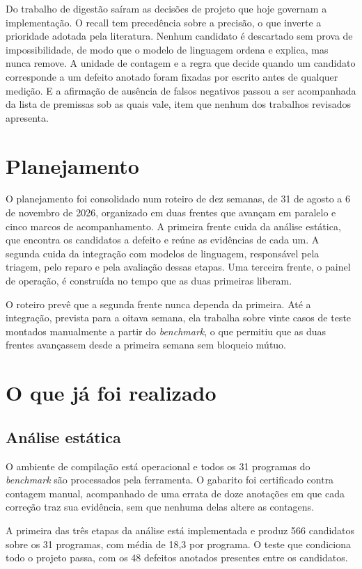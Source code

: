 \documentclass[article,12pt,oneside,a4paper,english,brazil]{abntex2}
\begin{document}
Do trabalho de digestão saíram as decisões de projeto que hoje governam a
implementação. O recall tem precedência sobre a precisão, o que inverte a
prioridade adotada pela literatura. Nenhum candidato é descartado sem prova de
impossibilidade, de modo que o modelo de linguagem ordena e explica, mas nunca
remove. A unidade de contagem e a regra que decide quando um candidato
corresponde a um defeito anotado foram fixadas por escrito antes de qualquer
medição. E a afirmação de ausência de falsos negativos passou a ser acompanhada
da lista de premissas sob as quais vale, item que nenhum dos trabalhos revisados
apresenta.

\section{Planejamento}

O planejamento foi consolidado num roteiro de dez semanas, de 31 de agosto a 6
de novembro de 2026, organizado em duas frentes que avançam em paralelo e cinco
marcos de acompanhamento. A primeira frente cuida da análise estática, que
encontra os candidatos a defeito e reúne as evidências de cada um. A segunda
cuida da integração com modelos de linguagem, responsável pela triagem, pelo
reparo e pela avaliação dessas etapas. Uma terceira frente, o painel de
operação, é construída no tempo que as duas primeiras liberam.

O roteiro prevê que a segunda frente nunca dependa da primeira. Até a
integração, prevista para a oitava semana, ela trabalha sobre vinte casos de
teste montados manualmente a partir do \textit{benchmark}, o que permitiu que as
duas frentes avançassem desde a primeira semana sem bloqueio mútuo.

\section{O que já foi realizado}

\subsection{Análise estática}

O ambiente de compilação está operacional e todos os 31 programas do
\textit{benchmark} são processados pela ferramenta. O gabarito foi certificado
contra contagem manual, acompanhado de uma errata de doze anotações em que cada
correção traz sua evidência, sem que nenhuma delas altere as contagens.

A primeira das três etapas da análise está implementada e produz 566 candidatos
sobre os 31 programas, com média de 18,3 por programa. O teste que condiciona
todo o projeto passa, com os 48 defeitos anotados presentes entre os candidatos.
\end{document}
